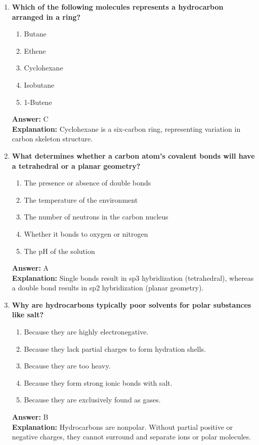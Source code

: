 \documentclass[11pt, a4paper]{article}
\begin{document}
\begin{enumerate}
\item \textbf{Which of the following molecules represents a hydrocarbon arranged in a ring?}
\begin{enumerate}[label=\Alph*.]
    \item Butane
    \item Ethene
    \item Cyclohexane
    \item Isobutane
    \item 1-Butene
\end{enumerate}
\textbf{Answer:} C \\
\textbf{Explanation:} Cyclohexane is a six-carbon ring, representing variation in carbon skeleton structure.

\item \textbf{What determines whether a carbon atom's covalent bonds will have a tetrahedral or a planar geometry?}
\begin{enumerate}[label=\Alph*.]
    \item The presence or absence of double bonds
    \item The temperature of the environment
    \item The number of neutrons in the carbon nucleus
    \item Whether it bonds to oxygen or nitrogen
    \item The pH of the solution
\end{enumerate}
\textbf{Answer:} A \\
\textbf{Explanation:} Single bonds result in sp3 hybridization (tetrahedral), whereas a double bond results in sp2 hybridization (planar geometry).

\item \textbf{Why are hydrocarbons typically poor solvents for polar substances like salt?}
\begin{enumerate}[label=\Alph*.]
    \item Because they are highly electronegative.
    \item Because they lack partial charges to form hydration shells.
    \item Because they are too heavy.
    \item Because they form strong ionic bonds with salt.
    \item Because they are exclusively found as gases.
\end{enumerate}
\textbf{Answer:} B \\
\textbf{Explanation:} Hydrocarbons are nonpolar. Without partial positive or negative charges, they cannot surround and separate ions or polar molecules.


\end{enumerate}
\end{document}

